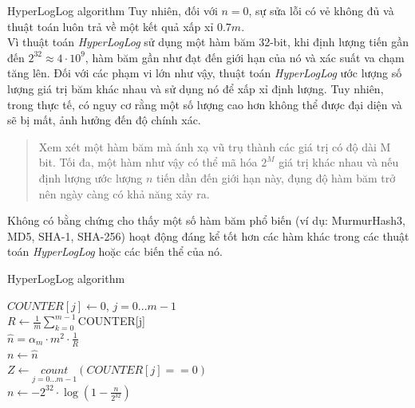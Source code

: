 \documentclass[10pt]{beamer}
\begin{document}
\begin{frame}{HyperLogLog algorithm}
  Tuy nhiên, đối với $n = 0$, sự sửa lỗi có vẻ không đủ và thuật toán luôn trả về một kết quả xấp xỉ $0.7m$.\\
  Vì thuật toán \textit{HyperLogLog} sử dụng một hàm băm 32-bit, khi định lượng tiến gần đến $2^{32}\approx 4 \cdot 10^9$, 
  hàm băm gần như đạt đến giới hạn của nó và xác suất va chạm tăng lên. Đối với các phạm vi lớn như vậy, thuật toán \textit{HyperLogLog} 
  ước lượng số lượng giá trị băm khác nhau và sử dụng nó để xấp xỉ định lượng. Tuy nhiên, trong thực tế, có nguy cơ rằng một số lượng cao hơn 
  không thể được đại diện và sẽ bị mất, ảnh hưởng đến độ chính xác.\\
  
  \begin{quote}
      Xem xét một hàm băm mà ánh xạ vũ trụ thành các giá trị có độ dài M bit. Tối đa, một hàm như vậy có thể mã hóa $2^M$ 
      giá trị khác nhau và nếu định lượng ước lượng $n$ tiến dần đến giới hạn này, đụng độ hàm băm trở nên ngày càng có khả năng xảy ra.
      \vspace{0.25cm}
  \end{quote}
  \newpage
  \indent Không có bằng chứng cho thấy một số hàm băm phổ biến (ví dụ: MurmurHash3, MD5, SHA-1, SHA-256) 
  hoạt động đáng kể tốt hơn các hàm khác trong các thuật toán \textit{HyperLogLog} hoặc các biến thể của nó.
\end{frame}
\begin{frame}{HyperLogLog algorithm}
  \begin{algorithm}[H]
    \DontPrintSemicolon
    \LinesNumberedHidden
    \caption[]{Estimatin cardinality with \textit{HyperLogLog}}
    $COUNTER[j] \gets $0, $j = 0...m - 1$\\
    $R \gets \frac{1}{m} \sum\limits_{k=0}^{m-1}$COUNTER[j] \\
    $\hat{n} = \alpha_m \cdot m^2 \cdot \frac{1}{R}$ \\
    $n \gets \hat{n}$ \\
    {
        $Z \gets \underset{j=0...m-1}{count}\left(COUNTER[j] == 0\right)$\\
    }
    {
        $n \gets -2^{32}\cdot\log\left(1-\frac{n}{2^{32}}\right)$
    }
\end{algorithm}
\end{frame}
\end{document}
